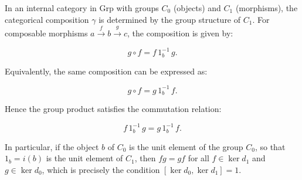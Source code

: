 In an internal category in Grp with groups $C_0$ (objects) and $C_1$ (morphisms), the categorical composition $\gamma$ is determined by the group structure of $C_1$. For composable morphisms $a \xrightarrow{f} b \xrightarrow{g} c$, the composition is given by:

$$g \circ f = f \, 1_b^{-1} \, g.$$

Equivalently, the same composition can be expressed as:

$$g \circ f = g \, 1_b^{-1} \, f.$$

Hence the group product satisfies the commutation relation:

$$f \, 1_b^{-1} \, g = g \, 1_b^{-1} \, f.$$

In particular, if the object $b$ of $C_0$ is the unit element of the group $C_0$, so that $1_b = i(b)$ is the unit element of $C_1$, then $f g = g f$ for all $f \in \ker d_1$ and $g \in \ker d_0$, which is precisely the condition $[\ker d_0, \ker d_1] = 1$.
